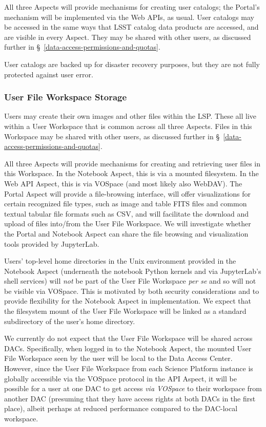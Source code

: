 All three Aspects will provide mechanisms for creating user catalogs; the
Portal's mechanism will be implemented via the Web APIs, as usual.
User catalogs may be accessed in the same ways that LSST catalog data products
are accessed, and are visible in every Aspect.
They may be shared with other users, as discussed further in
\S~\ref{data-access-permissions-and-quotas}.

User catalogs are backed up for disaster recovery purposes, but they are not
fully protected against user error.

\subsubsection{User File Workspace Storage}\label{user-workspace-storage}

Users may create their own images and other files within the LSP.
These all live within a User Workspace that is common across all three Aspects.
Files in this Workspace may be shared with other users, as discussed further in
\S~\ref{data-access-permissions-and-quotas}.

All three Aspects will provide mechanisms for creating and retrieving user
files in this Workspace.
In the Notebook Aspect, this is via a mounted filesystem.  
In the Web API Aspect, this is via VOSpace (and most likely also WebDAV).
The Portal Aspect will provide a file-browsing interface, will offer
visualizations for certain recognized file types, such as image and table
FITS files and common textual tabular file formats such as CSV, and will
facilitate the download and upload of files into/from the User File Workspace.
We will investigate whether the Portal and Notebook Aspect can share the
file browsing and visualization tools provided by JupyterLab.

Users' top-level home directories in the Unix environment provided in the
Notebook Aspect (underneath the notebook Python kernels and via JupyterLab's
shell services) will \emph{not} be part of the User File Workspace \emph{per
se} and so will not be visible via VOSpace.
This is motivated by both security considerations and to provide flexibility
for the Notebook Aspect in implementation.
We expect that the filesystem mount of the User File Workspace will be 
linked as a standard subdirectory of the user's home directory.

We currently do not expect that the User File Workspace will be shared 
across DACs.
Specifically, when logged in to the Notebook Aspect, the mounted User File
Workspace seen by the user will be local to the Data Access Center.
However, since the User File Workspace from each Science Platform instance
is globally accessible via the VOSpace protocol in the API Aspect, it will be
possible for a user at one DAC to get access \emph{via VOSpace}
to their workspace from another DAC
(presuming that they have access rights at both DACs in the first place),
albeit perhaps at reduced performance compared to the DAC-local workspace.

